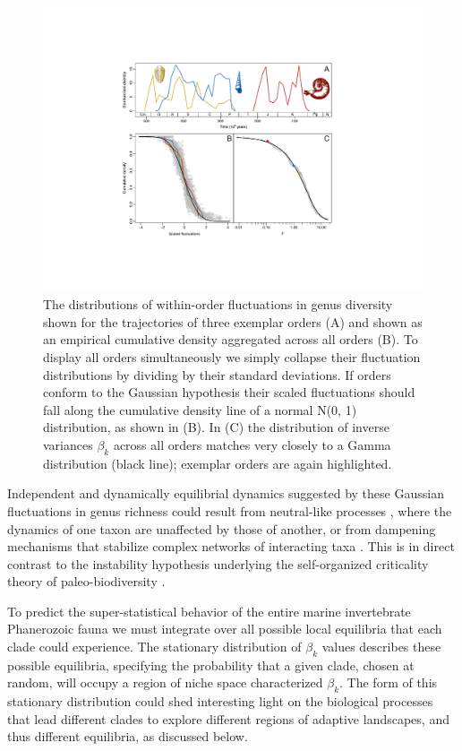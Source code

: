 \documentclass[12pt]{article}
\let\citep=\cite
\begin{document}
\begin{figure}[!h]
  \centering
  \includegraphics[scale=0.8]{figs/fig_pkx-fbeta.pdf}
  \caption[Variability in trajectories of within-order fluctuations in
  genus diversity]{The distributions of within-order fluctuations in
    genus diversity shown for the trajectories of three exemplar
    orders (A) and shown as an empirical cumulative density aggregated
    across all orders (B). To display all orders simultaneously we
    simply collapse their fluctuation distributions by dividing by
    their standard deviations. If orders conform to the Gaussian
    hypothesis their scaled fluctuations should fall along the
    cumulative density line of a normal N(0, 1) distribution, as shown
    in (B). In (C) the distribution of inverse variances $\beta_k$
    across all orders matches very closely to a Gamma distribution
    (black line); exemplar orders are again highlighted.}
  \label{fig:pk_f}
\end{figure}

Independent and dynamically equilibrial dynamics suggested by these
Gaussian fluctuations in genus richness could result from neutral-like
processes \citep{hubbell2001}, where the dynamics of one taxon are
unaffected by those of another, or from dampening mechanisms that
stabilize complex networks of interacting taxa \citep{brose2005}. This
is in direct contrast to the instability hypothesis underlying the
self-organized criticality theory of paleo-biodiversity
\citep{bak1993, sole1997}.

To predict the super-statistical behavior of the entire marine
invertebrate Phanerozoic fauna we must integrate over all possible
local equilibria that each clade could experience. The stationary
distribution of $\beta_k$ values describes these possible equilibria,
specifying the probability that a given clade, chosen at random, will
occupy a region of niche space characterized $\beta_k$. The form of
this stationary distribution could shed interesting light on the
biological processes that lead different clades to explore different
regions of adaptive landscapes, and thus different equilibria, as
discussed below.
\end{document}
